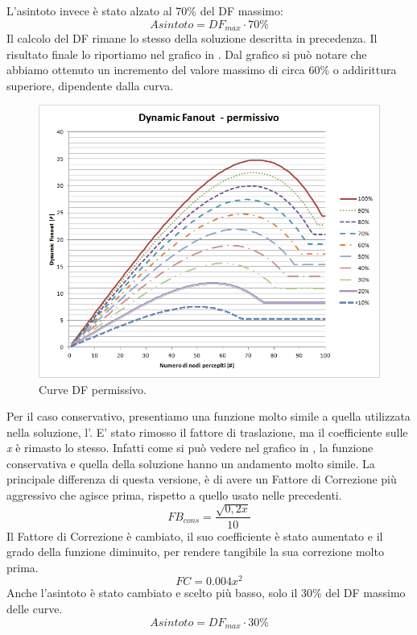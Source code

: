 L'asintoto invece è stato alzato al 70\% del DF massimo:
\begin{equation}
	\label{eq:df_asintoto_perm}
	Asintoto = DF_{max}\cdot 70\%
\end{equation}
Il calcolo del DF rimane lo stesso della soluzione descritta in precedenza. Il risultato finale lo riportiamo nel grafico in . Dal grafico si può notare che abbiamo ottenuto un incremento del valore massimo di circa 60\% o addirittura superiore, dipendente dalla curva.
\begin{figure}[t]
	\centering
	\includegraphics[width=0.9\linewidth]{Images/grafici_usati/DF_permissivo_tot_no_arr}
	\caption[DF permissivo]{Curve DF permissivo.}
	\label{fig:DF_permissivo_tot_no_arr}
\end{figure}
\bigskip


Per il caso conservativo, presentiamo una funzione molto simile a quella utilizzata nella soluzione, l'. E' stato rimosso il fattore di traslazione, ma il coefficiente sulle \textit{x} è rimasto lo stesso. Infatti come si può vedere nel grafico in , la funzione conservativa e quella della soluzione hanno un andamento molto simile. La principale differenza di questa versione, è di avere un Fattore di Correzione più aggressivo che agisce prima, rispetto a quello usato nelle precedenti.
\begin{equation}
	FB_{cons}=\dfrac{\sqrt{0,2x}}{10}\nonumber
\end{equation}
Il Fattore di Correzione è cambiato, il suo coefficiente è stato aumentato e il grado della funzione diminuito, per rendere tangibile la sua correzione molto prima.
\begin{equation}
	FC = 0.004x^2
\end{equation}
Anche l'asintoto è stato cambiato e scelto più basso, solo il 30\% del DF massimo delle curve.
\begin{equation}
	Asintoto = DF_{max}\cdot 30\%
\end{equation}


